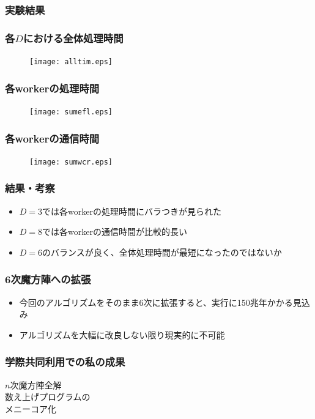 \documentclass[dvipdfmx,20pt,notheorems,t]{beamer}
\begin{document}
\begin{frame}\frametitle{実験結果}
\end{frame}

\begin{frame}\frametitle{各$D$における全体処理時間}
\begin{figure}[htb]
\centering
\texttt{[image: alltim.eps]}
\end{figure}
\end{frame}

\begin{frame}\frametitle{各workerの処理時間}
\begin{figure}[htb]
\centering
\texttt{[image: sumefl.eps]}
\end{figure}
\end{frame}

\begin{frame}\frametitle{各workerの通信時間}
\begin{figure}[htb]
\centering
\texttt{[image: sumwcr.eps]}
\end{figure}
\end{frame}

\begin{frame}\frametitle{結果・考察}
\begin{itemize}
\item $D=3$では各workerの処理時間にバラつきが見られた
\item $D=8$では各workerの通信時間が比較的長い
\item $D=6$のバランスが良く、全体処理時間が最短になったのではないか
\end{itemize}
\end{frame}

\begin{frame}\frametitle{6次魔方陣への拡張}
\begin{itemize}
\item 今回のアルゴリズムをそのまま6次に拡張すると、実行に150兆年かかる見込み
\item アルゴリズムを大幅に改良しない限り現実的に不可能
\end{itemize}
\end{frame}

\begin{frame}\frametitle{学際共同利用での私の成果}
\centering
\large
$n$次魔方陣全解 \\
数え上げプログラムの \\
メニーコア化\\
\end{frame}
\end{document}
